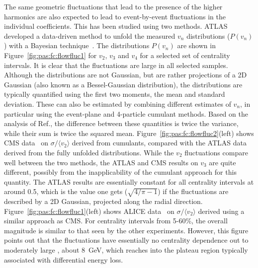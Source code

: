 The same geometric fluctuations that lead to the presence of the higher harmonics are also expected to lead to
event-by-event fluctuations in the individual coefficients.  This has been studied using two methods.
ATLAS developed a data-driven method to unfold the measured $v_n$ distributions ($P(v_n)$) with a Bayesian
technique~\cite{Aad:2013xma}.  The distributions $P(v_n)$ are shown in Figure~\ref{fig:pas:fc:flowfluc1} for $v_2$, $v_3$ and $v_4$
for a selected set of centrality intervals.  It is clear that the fluctuations are large in all selected samples.
Although the distributions are not Gaussian, but are rather projections of a 2D Gaussian (also known as a
Bessel-Gaussian distribution),
the distributions are typically quantified using the first two moments, the mean and standard deviation.
These can also be estimated by combining different estimates of $v_n$, in particular using the event-plane
and 4-particle cumulant methods.  Based on the analysis of Ref.{},
the difference between these quantities is twice the variance, while their sum is twice the squared mean.
Figure~\ref{fig:pas:fc:flowfluc2}(left) shows CMS data~\cite{Chatrchyan:2013kba} on $\sigma/\langle v_2 \rangle$ derived
from cumulants, compared with the ATLAS data derived from the fully unfolded distributions.
While the $v_2$ fluctuations compare well between the two methods, the ATLAS and CMS results on $v_3$
are quite different, possibly from the inapplicability of the cumulant approach for this quantity.
The ATLAS results are essentially constant for all centrality intervals at around 0.5, which is the
value one gets ($\sqrt{4/\pi-1}$) if the fluctuations are described by a 2D Gaussian,
projected along the radial direction.
Figure~\ref{fig:pas:fc:flowfluc1}(left) shows ALICE data~\cite{Abelev:2012di} on $\sigma/\langle v_2 \rangle$ derived
using a similar approach as CMS.  For centrality intervals from 5-60\%, the overall magnitude
is similar to that seen by the other experiments.  However, this figure points out that the fluctuations
have essentially no centrality dependence out to moderately large \pT, about 8~GeV, which reaches into
the plateau region typically associated with differential energy loss.




